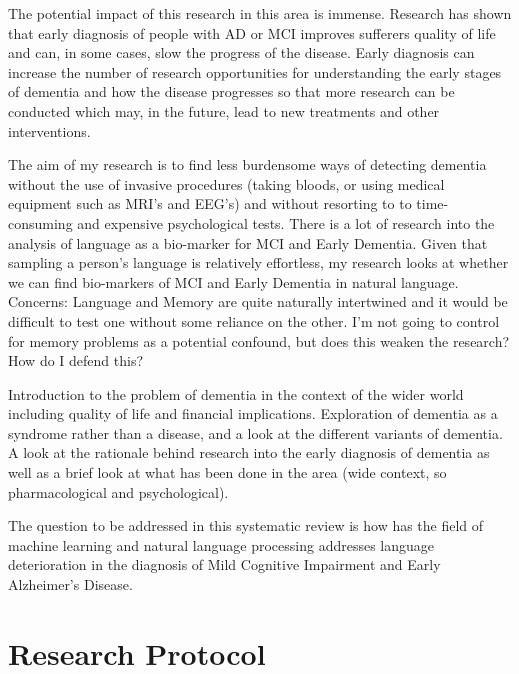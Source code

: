 \documentclass[12pt]{article}
\begin{document}
\par
The potential impact of this research in this area is immense. Research has shown that early diagnosis of people with AD or MCI improves sufferers quality of life and can, in some cases, slow the progress of the disease. Early diagnosis can increase the number of research opportunities for understanding the early stages of dementia and how the disease progresses so that more research can be conducted which may, in the future, lead to new treatments and other interventions.

The aim of my research is to find less burdensome ways of detecting dementia without the use of invasive procedures (taking bloods, or using medical equipment such as MRI's and EEG's) and without resorting to to time-consuming and expensive psychological tests. There is a lot of research into the analysis of language as a bio-marker for MCI and Early Dementia. Given that sampling a person's language is relatively effortless, my research looks at whether we can find bio-markers of MCI and Early Dementia in natural language.\newline
Concerns: Language and Memory are quite naturally intertwined and it would be difficult to test one without some reliance on the other. I'm not going to control for memory problems as a potential confound, but does this weaken the research? How do I defend this? \newline
\par 
Introduction to the problem of dementia in the context of the wider world including quality of life and financial implications. Exploration of dementia as a syndrome rather than a disease, and a look at the different variants of dementia. A look at the rationale behind research into the early diagnosis of dementia as well as a brief look at what has been done in the area (wide context, so pharmacological and psychological). \newline

The question to be addressed in this systematic review is how has the field of machine learning and natural language processing addresses language deterioration in the diagnosis of Mild Cognitive Impairment and Early Alzheimer's Disease.
\section{Research Protocol}
\end{document}
